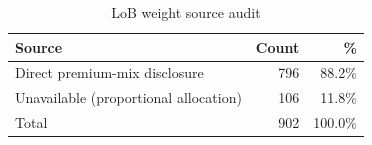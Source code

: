 \begin{table}[htbp]
\centering
\caption{LoB weight source audit}
\label{tab:lob_weight_source_audit}
\begin{tabular}{lrr}
\toprule
\textbf{Source} & \textbf{Count} & \textbf{\%} \\
\midrule
Direct premium-mix disclosure & 796 & 88.2\% \\
Unavailable (proportional allocation) & 106 & 11.8\% \\
\midrule
Total & 902 & 100.0\% \\
\bottomrule
\end{tabular}
\end{table}
